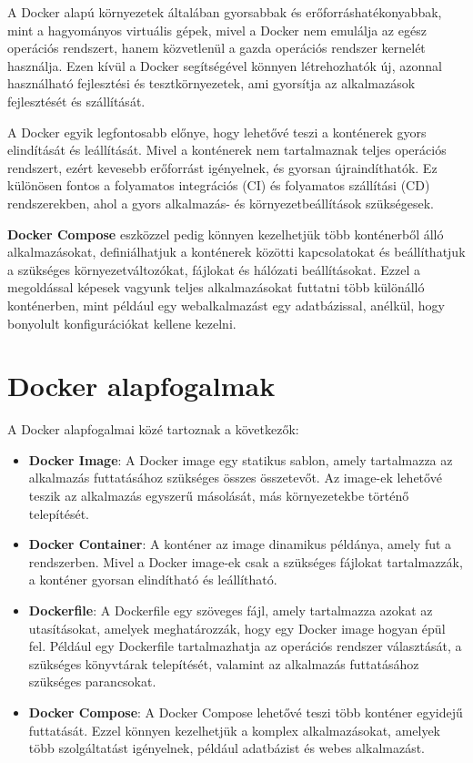 A Docker alapú környezetek általában gyorsabbak és erőforráshatékonyabbak, mint a hagyományos virtuális gépek, mivel a Docker nem emulálja az egész operációs rendszert, hanem közvetlenül a gazda operációs rendszer kernelét használja. Ezen kívül a Docker segítségével könnyen létrehozhatók új, azonnal használható fejlesztési és tesztkörnyezetek, ami gyorsítja az alkalmazások fejlesztését és szállítását.

A Docker egyik legfontosabb előnye, hogy lehetővé teszi a konténerek gyors elindítását és leállítását. Mivel a konténerek nem tartalmaznak teljes operációs rendszert, ezért kevesebb erőforrást igényelnek, és gyorsan újraindíthatók. Ez különösen fontos a folyamatos integrációs (CI) és folyamatos szállítási (CD) rendszerekben, ahol a gyors alkalmazás- és környezetbeállítások szükségesek.

\textbf{Docker Compose} eszközzel pedig könnyen kezelhetjük több konténerből álló alkalmazásokat, definiálhatjuk a konténerek közötti kapcsolatokat és beállíthatjuk a szükséges környezetváltozókat, fájlokat és hálózati beállításokat. Ezzel a megoldással képesek vagyunk teljes alkalmazásokat futtatni több különálló konténerben, mint például egy webalkalmazást egy adatbázissal, anélkül, hogy bonyolult konfigurációkat kellene kezelni.



\section{Docker alapfogalmak}

A Docker alapfogalmai közé tartoznak a következők:

\begin{itemize}
	\item \textbf{Docker Image}: A Docker image egy statikus sablon, amely tartalmazza az alkalmazás futtatásához szükséges összes összetevőt. Az image-ek lehetővé teszik az alkalmazás egyszerű másolását, más környezetekbe történő telepítését.
	\item \textbf{Docker Container}: A konténer az image dinamikus példánya, amely fut a rendszerben. Mivel a Docker image-ek csak a szükséges fájlokat tartalmazzák, a konténer gyorsan elindítható és leállítható.
	\item \textbf{Dockerfile}: A Dockerfile egy szöveges fájl, amely tartalmazza azokat az utasításokat, amelyek meghatározzák, hogy egy Docker image hogyan épül fel. Például egy Dockerfile tartalmazhatja az operációs rendszer választását, a szükséges könyvtárak telepítését, valamint az alkalmazás futtatásához szükséges parancsokat.
	\item \textbf{Docker Compose}: A Docker Compose lehetővé teszi több konténer egyidejű futtatását. Ezzel könnyen kezelhetjük a komplex alkalmazásokat, amelyek több szolgáltatást igényelnek, például adatbázist és webes alkalmazást.
\end{itemize}

